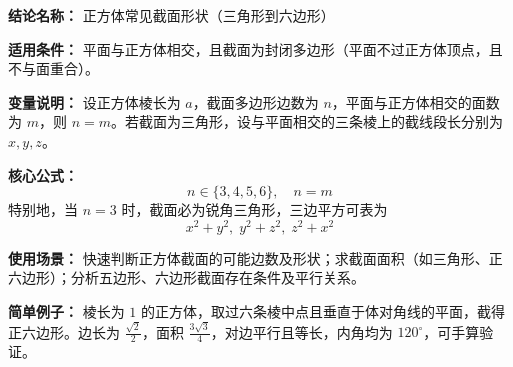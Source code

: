 \textbf{结论名称：} 正方体常见截面形状（三角形到六边形）

\textbf{适用条件：} 平面与正方体相交，且截面为封闭多边形（平面不过正方体顶点，且不与面重合）。

\textbf{变量说明：} 设正方体棱长为 \(a\)，截面多边形边数为 \(n\)，平面与正方体相交的面数为 \(m\)，则 \(n=m\)。若截面为三角形，设与平面相交的三条棱上的截线段长分别为 \(x,y,z\)。

\textbf{核心公式：}
\[ \boxed{n \in \{3,4,5,6\},\quad n=m} \]
特别地，当 \(n=3\) 时，截面必为锐角三角形，三边平方可表为
\[ \boxed{x^2+y^2,\; y^2+z^2,\; z^2+x^2} \]

\textbf{使用场景：} 快速判断正方体截面的可能边数及形状；求截面面积（如三角形、正六边形）；分析五边形、六边形截面存在条件及平行关系。

\textbf{简单例子：} 棱长为 \(1\) 的正方体，取过六条棱中点且垂直于体对角线的平面，截得正六边形。边长为 \(\frac{\sqrt{2}}{2}\)，面积 \(\frac{3\sqrt{3}}{4}\)，对边平行且等长，内角均为 \(120^\circ\)，可手算验证。